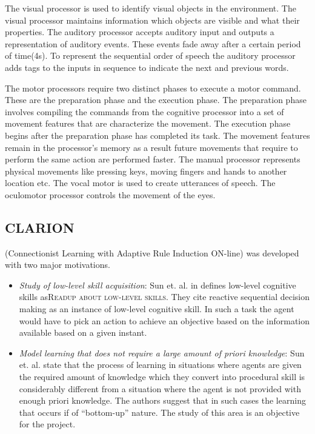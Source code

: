 The visual processor is used to identify visual objects in the
environment. The visual processor maintains information which objects
are visible and what their properties. The auditory processor accepts
auditory input and outputs a representation of auditory events. These
events fade away after a certain period of time(4s). To represent the
sequential order of speech the auditory processor adds tags to the
inputs in sequence to indicate the next and previous words.

The motor processors require two distinct phases to execute a motor
command. These are the preparation phase and the execution phase. The
preparation phase involves compiling the commands from the cognitive
processor into a set of movement features that are characterize the
movement. The execution phase begins after the preparation phase has
completed its task. The movement features remain in the processor's
memory as a result future movements that require to perform the same
action are performed faster. The manual processor represents physical
movements like pressing keys, moving fingers and hands to another
location etc. The vocal motor is used to create utterances of
speech. The oculomotor processor controls the movement of the eyes.
 

\subsection{CLARION}
\clarion (Connectionist Learning with Adaptive Rule Induction ON-line)
\cite{journals/cogsci/SunMP01} was developed with two major
motivations. 

\begin{itemize}
\item \emph{Study of low-level skill acquisition}: Sun et. al. in
  \cite{journals/cogsci/SunMP01} defines low-level cognitive skills as\textsc{Readup about low-level
    skills}. They cite reactive sequential decision making as an
  instance of low-level cognitive skill. In such a task the agent
  would have to pick an action to achieve an objective based on the
  information available based on a given instant.
\item \emph{Model learning that does not require a large amount of
    priori knowledge}: Sun et. al. state that the process of learning
  in situations where agents are given the required amount of
  knowledge which they convert into procedural skill is considerably
  different from a situation where the agent is not provided with
  enough priori knowledge. The authors suggest that in such cases the
  learning that occurs if of ``bottom-up'' nature. The study of this
  area is an objective for the \clarion project.
\end{itemize}

